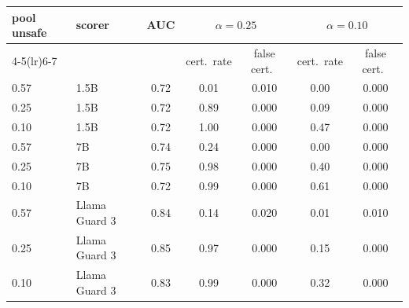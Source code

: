 \begin{tabular}{llccccc}
\toprule
pool unsafe & scorer & AUC & \multicolumn{2}{c}{$\alpha=0.25$} & \multicolumn{2}{c}{$\alpha=0.10$} \\
\cmidrule(lr){4-5}\cmidrule(lr){6-7}
 & & & cert.\ rate & false cert.\ & cert.\ rate & false cert.\ \\
\midrule
0.57 & 1.5B & 0.72 & 0.01 & 0.010 & 0.00 & 0.000 \\
0.25 & 1.5B & 0.72 & 0.89 & 0.000 & 0.09 & 0.000 \\
0.10 & 1.5B & 0.72 & 1.00 & 0.000 & 0.47 & 0.000 \\
0.57 & 7B & 0.74 & 0.24 & 0.000 & 0.00 & 0.000 \\
0.25 & 7B & 0.75 & 0.98 & 0.000 & 0.40 & 0.000 \\
0.10 & 7B & 0.72 & 0.99 & 0.000 & 0.61 & 0.000 \\
0.57 & Llama Guard 3 & 0.84 & 0.14 & 0.020 & 0.01 & 0.010 \\
0.25 & Llama Guard 3 & 0.85 & 0.97 & 0.000 & 0.15 & 0.000 \\
0.10 & Llama Guard 3 & 0.83 & 0.99 & 0.000 & 0.32 & 0.000 \\
\bottomrule
\end{tabular}
